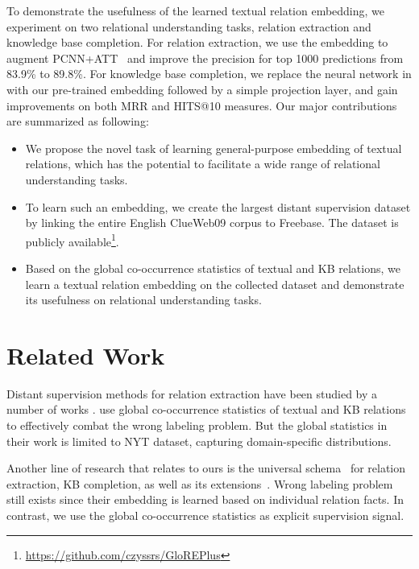 \documentclass[11pt,a4paper]{article}
\newcommand{\nop}[1]{}
\begin{document}
To demonstrate the usefulness of the learned textual relation embedding, we experiment on two relational understanding tasks, relation extraction and knowledge base completion. For relation extraction, we use the embedding to augment PCNN+ATT~\cite{lin2016neural}\nop{ and improve the best -score from 42.7\% to 44.6\%,} and improve the precision for top 1000 predictions from 83.9\% to 89.8\%. For knowledge base completion, we replace the neural network in \cite{toutanova2015representing} with our pre-trained embedding followed by a simple projection layer, and gain improvements on both MRR and HITS@10 measures. 
Our major contributions are summarized as following:
\begin{itemize}
\item We propose the novel task of learning general-purpose embedding of textual relations, which has the potential to facilitate a wide range of relational understanding tasks.
\item To learn such an embedding, we create the largest distant supervision dataset by linking the entire English ClueWeb09 corpus to Freebase. The dataset is publicly available\footnote{\href{https://github.com/czyssrs/GloREPlus}{https://github.com/czyssrs/GloREPlus}}. 
\item Based on the global co-occurrence statistics of textual and KB relations, we learn a textual relation embedding on the collected dataset and demonstrate its usefulness on relational understanding tasks. 
\end{itemize} \section{Related Work}
\label{sec:related}












Distant supervision methods \cite{mintz2009distant} for relation extraction have been studied by a number of works \cite{riedel2010modeling,hoffmann2011knowledge,surdeanu2012multi,zeng2015distant,lin2016neural,ji2017distant,wu2017adversarial}.
\cite{su2017global} use global co-occurrence statistics of textual and KB relations to effectively combat the wrong labeling problem. But the global statistics in their work is limited to NYT dataset, capturing domain-specific distributions.




Another line of research that relates to ours is the universal schema~\cite{riedel2013relation} for relation extraction, KB completion, as well as its extensions~\cite{toutanova2015representing,verga2016multilingual}. 
Wrong labeling problem still exists since their embedding is learned based on individual relation facts. In contrast, we use the global co-occurrence statistics as explicit supervision signal. 
\end{document}
